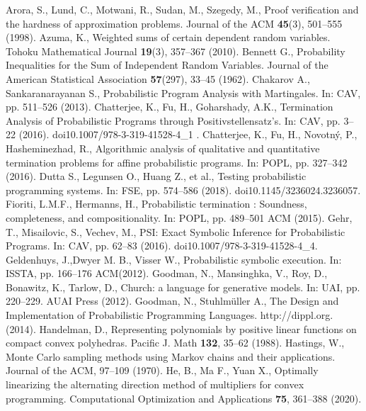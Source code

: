 \documentclass[conference]{IEEEtran}
\begin{document}
\begin{thebibliography}{00}
Arora, S., Lund, C., Motwani, R., Sudan, M., Szegedy, M., Proof verification and the hardness of approximation problems. Journal of the ACM \textbf{45}(3), 501--555 (1998).
Azuma, K., Weighted sums of certain dependent random variables. Tohoku Mathematical Journal \textbf{19}(3), 357--367 (2010).
Bennett G., Probability Inequalities for the Sum of Independent Random Variables. Journal of the American Statistical Association \textbf{57}(297), 33--45 (1962).
Chakarov A., Sankaranarayanan S., Probabilistic Program Analysis with Martingales. In: CAV, pp. 511--526  (2013).
Chatterjee, K., Fu, H., Goharshady, A.K., Termination Analysis of Probabilistic Programs through Positivstellensatz's. In: CAV, pp. 3--22 (2016). doi{10.1007/978-3-319-41528-4\_1 }.
Chatterjee, K., Fu, H., Novotn\'{y}, P., Hasheminezhad, R., Algorithmic analysis of
qualitative and quantitative termination problems for affine probabilistic programs. In: POPL, pp. 327--342 (2016).
Dutta S., Legunsen O., Huang Z., et al., Testing probabilistic programming systems. In: FSE, pp. 574--586 (2018). doi{10.1145/3236024.3236057}.
Fioriti, L.M.F., Hermanns, H., Probabilistic termination : Soundness, completeness, and compositionality. In: POPL, pp. 489--501 ACM (2015).
Gehr, T., Misailovic, S., Vechev, M., {PSI:} Exact Symbolic Inference for Probabilistic Programs. In: CAV, pp. 62--83 (2016). doi{10.1007/978-3-319-41528-4\_4}.
Geldenhuys, J.,Dwyer M. B., Visser W., Probabilistic symbolic execution. In: ISSTA, pp. 166--176 ACM(2012).
Goodman, N., Mansinghka, V., Roy, D., Bonawitz, K., Tarlow, D., Church: a language for generative models. In: UAI, pp. 220--229. AUAI Press (2012).
Goodman, N., Stuhlmüller A., The Design and Implementation of Probabilistic Programming Languages. http://dippl.org.  (2014).
Handelman, D., Representing polynomials by positive linear functions on compact convex polyhedras. Pacific J. Math \textbf{132}, 35--62 (1988).
Hastings, W., Monte Carlo sampling methods using Markov chains and their applications. Journal of the ACM, 97--109 (1970).
He, B., Ma F., Yuan X., Optimally linearizing the alternating direction method of multipliers for convex programming. Computational Optimization and Applications \textbf{75}, 361--388 (2020).

\end{thebibliography}
\end{document}
